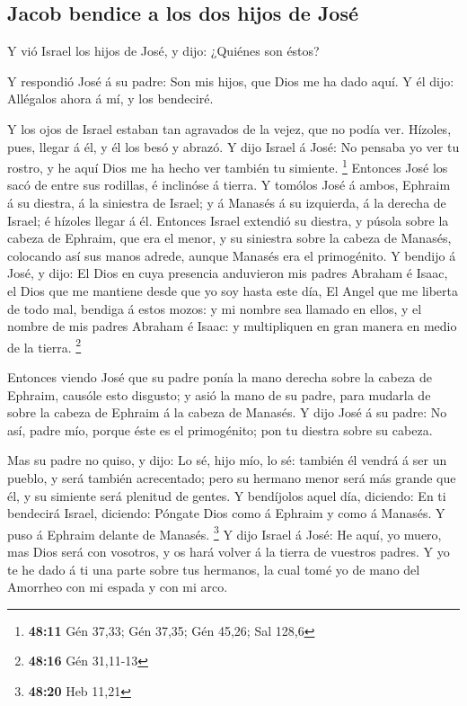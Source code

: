 \hypertarget{jacob-bendice-a-los-dos-hijos-de-josuxe9}{%
\subsection{Jacob bendice a los dos hijos de
José}\label{jacob-bendice-a-los-dos-hijos-de-josuxe9}}

 Y vió Israel los hijos de José, y dijo: ¿Quiénes son éstos?

 Y respondió José á su padre: Son mis hijos, que Dios me ha
dado aquí. Y él dijo: Allégalos ahora á mí, y los bendeciré.

 Y los ojos de Israel estaban tan agravados de la vejez,
que no podía ver. Hízoles, pues, llegar á él, y él los besó y abrazó.
 Y dijo Israel á José: No pensaba yo ver tu rostro, y he
aquí Dios me ha hecho ver también tu simiente. \footnote{\textbf{48:11}
  Gén 37,33; Gén 37,35; Gén 45,26; Sal 128,6}  Entonces
José los sacó de entre sus rodillas, é inclinóse á tierra. 
Y tomólos José á ambos, Ephraim á su diestra, á la siniestra de Israel;
y á Manasés á su izquierda, á la derecha de Israel; é hízoles llegar á
él.  Entonces Israel extendió su diestra, y púsola sobre la
cabeza de Ephraim, que era el menor, y su siniestra sobre la cabeza de
Manasés, colocando así sus manos adrede, aunque Manasés era el
primogénito.  Y bendijo á José, y dijo: El Dios en cuya
presencia anduvieron mis padres Abraham é Isaac, el Dios que me mantiene
desde que yo soy hasta este día,  El Angel que me liberta
de todo mal, bendiga á estos mozos: y mi nombre sea llamado en ellos, y
el nombre de mis padres Abraham é Isaac: y multipliquen en gran manera
en medio de la tierra. \footnote{\textbf{48:16} Gén 31,11-13}

 Entonces viendo José que su padre ponía la mano derecha
sobre la cabeza de Ephraim, causóle esto disgusto; y asió la mano de su
padre, para mudarla de sobre la cabeza de Ephraim á la cabeza de
Manasés.  Y dijo José á su padre: No así, padre mío, porque
éste es el primogénito; pon tu diestra sobre su cabeza.

 Mas su padre no quiso, y dijo: Lo sé, hijo mío, lo sé:
también él vendrá á ser un pueblo, y será también acrecentado; pero su
hermano menor será más grande que él, y su simiente será plenitud de
gentes.  Y bendíjolos aquel día, diciendo: En ti bendecirá
Israel, diciendo: Póngate Dios como á Ephraim y como á Manasés. Y puso á
Ephraim delante de Manasés. \footnote{\textbf{48:20} Heb 11,21}
 Y dijo Israel á José: He aquí, yo muero, mas Dios será con
vosotros, y os hará volver á la tierra de vuestros padres. 
Y yo te he dado á ti una parte sobre tus hermanos, la cual tomé yo de
mano del Amorrheo con mi espada y con mi arco.

